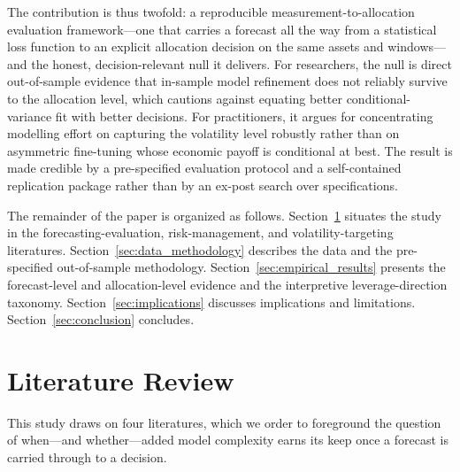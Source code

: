 The contribution is thus twofold: a reproducible measurement-to-allocation evaluation framework---one that carries a forecast all the way from a statistical loss function to an explicit allocation decision on the same assets and windows---and the honest, decision-relevant null it delivers. For researchers, the null is direct out-of-sample evidence that in-sample model refinement does not reliably survive to the allocation level, which cautions against equating better conditional-variance fit with better decisions. For practitioners, it argues for concentrating modelling effort on capturing the volatility level robustly rather than on asymmetric fine-tuning whose economic payoff is conditional at best. The result is made credible by a pre-specified evaluation protocol and a self-contained replication package rather than by an ex-post search over specifications.

The remainder of the paper is organized as follows. Section~\ref{sec:literature} situates the study in the forecasting-evaluation, risk-management, and volatility-targeting literatures. Section~\ref{sec:data_methodology} describes the data and the pre-specified out-of-sample methodology. Section~\ref{sec:empirical_results} presents the forecast-level and allocation-level evidence and the interpretive leverage-direction taxonomy. Section~\ref{sec:implications} discusses implications and limitations. Section~\ref{sec:conclusion} concludes.



\section{Literature Review}\label{sec:literature}

This study draws on four literatures, which we order to foreground the question of when---and whether---added model complexity earns its keep once a forecast is carried through to a decision.

